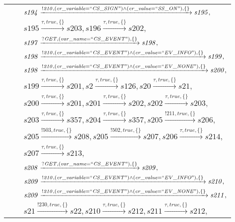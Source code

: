 \begin{tabular}{lcl}
& & $\mathit{s194}\xrightarrow{\mathit{!210}, \mathit{(cr\_variable = ``CS\_SIGN") \land (cr\_value = ``SS\_ON")}, \{\}}\mathit{s195},$ \\
& & $\mathit{s195}\xrightarrow{\mathit{\tau}, \mathit{true}, \{\}}\mathit{s203},\mathit{s196}\xrightarrow{\mathit{\tau}, \mathit{true}, \{\}}\mathit{s202},$ \\
& & $\mathit{s197}\xrightarrow{\mathit{?GET}, \mathit{(var\_name = ``CS\_EVENT")}, \{\}}\mathit{s198},$ \\
& & $\mathit{s198}\xrightarrow{\mathit{!210}, \mathit{(cr\_variable = ``CS\_EVENT") \land (cr\_value = ``EV\_INFO")}, \{\}}\mathit{s199},$ \\
& & $\mathit{s198}\xrightarrow{\mathit{!210}, \mathit{(cr\_variable = ``CS\_EVENT") \land (cr\_value = ``EV\_NONE")}, \{\}}\mathit{s200},$ \\
& & $\mathit{s199}\xrightarrow{\mathit{\tau}, \mathit{true}, \{\}}\mathit{s201},\mathit{s2}\xrightarrow{\mathit{\tau}, \mathit{true}, \{\}}\mathit{s126},\mathit{s20}\xrightarrow{\mathit{\tau}, \mathit{true}, \{\}}\mathit{s21},$ \\
& & $\mathit{s200}\xrightarrow{\mathit{\tau}, \mathit{true}, \{\}}\mathit{s201},\mathit{s201}\xrightarrow{\mathit{\tau}, \mathit{true}, \{\}}\mathit{s202},\mathit{s202}\xrightarrow{\mathit{\tau}, \mathit{true}, \{\}}\mathit{s203},$ \\
& & $\mathit{s203}\xrightarrow{\mathit{\tau}, \mathit{true}, \{\}}\mathit{s357},\mathit{s204}\xrightarrow{\mathit{\tau}, \mathit{true}, \{\}}\mathit{s357},\mathit{s205}\xrightarrow{\mathit{!211}, \mathit{true}, \{\}}\mathit{s206},$ \\
& & $\mathit{s205}\xrightarrow{\mathit{!503}, \mathit{true}, \{\}}\mathit{s208},\mathit{s205}\xrightarrow{\mathit{!502}, \mathit{true}, \{\}}\mathit{s207},\mathit{s206}\xrightarrow{\mathit{\tau}, \mathit{true}, \{\}}\mathit{s214},$ \\
& & $\mathit{s207}\xrightarrow{\mathit{\tau}, \mathit{true}, \{\}}\mathit{s213},$ \\
& & $\mathit{s208}\xrightarrow{\mathit{?GET}, \mathit{(var\_name = ``CS\_EVENT")}, \{\}}\mathit{s209},$ \\
& & $\mathit{s209}\xrightarrow{\mathit{!210}, \mathit{(cr\_variable = ``CS\_EVENT") \land (cr\_value = ``EV\_INFO")}, \{\}}\mathit{s210},$ \\
& & $\mathit{s209}\xrightarrow{\mathit{!210}, \mathit{(cr\_variable = ``CS\_EVENT") \land (cr\_value = ``EV\_NONE")}, \{\}}\mathit{s211},$ \\
& & $\mathit{s21}\xrightarrow{\mathit{!230}, \mathit{true}, \{\}}\mathit{s22},\mathit{s210}\xrightarrow{\mathit{\tau}, \mathit{true}, \{\}}\mathit{s212},\mathit{s211}\xrightarrow{\mathit{\tau}, \mathit{true}, \{\}}\mathit{s212},$ \\
\end{tabular}

